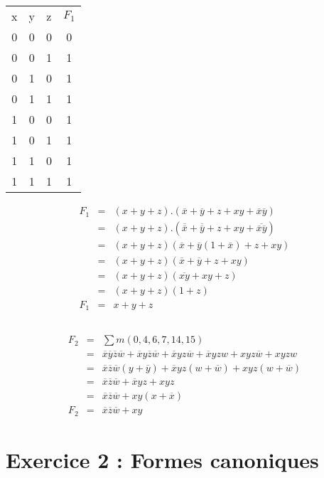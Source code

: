 \documentclass[12pt,a4paper,openany]{book}
\begin{document}
	\subsection{}
	\begin{tabular}{ccc||c}
		x&y&z & $F_1$\\
		0&0&0&	0\\
		0&0&1& 	1\\
		0&1&0& 	1\\
		0&1&1& 	1\\
		1&0&0& 	1\\
		1&0&1& 	1\\
		1&1&0& 	1\\
		1&1&1& 	1\\
	\end{tabular}
	\begin{eqnarray*}
		F_1 &=& (x+y+z).(\overline x + \overline y + z + xy + \overline x \overline y)\\
		&=& (x+y+z).(\overline{\overline x} + \overline{\overline y} + z + xy + \overline{\overline x \overline y})\\
		&=& (x+y+z)(\overline x + \overline y (1 + \overline x) + z +xy)\\
		&=& (x+y+z)(\overline x + \overline y + z + xy)\\
		&=& (x+y+z)(\overline{xy} + xy + z)\\
		&=& (x+y+z)(1+z)\\
		F_1 &=& x+y+z
	\end{eqnarray*}
	\subsection{}
	\begin{eqnarray*}
		F_2 &=& \sum m(0,4,6,7,14,15)\\
		&=& \overline x \overline y \overline z \overline w + \overline x y \overline z \overline w + \overline x y z \overline w + \overline x yzw + xyz\overline w + xyzw\\
		&=& \overline x \overline z \overline w(y+\overline y) +\overline x yz (w+\overline w) + xyz(w + \overline w)\\
		&=& \overline x \overline z \overline w + \overline x y z + xyz\\
		&=& \overline x \overline z \overline w + xy(x + \overline x)\\
		F_2 &=& \overline x \overline z \overline w + xy
	\end{eqnarray*}
	\section{Exercice 2 : Formes canoniques}
\end{document}
